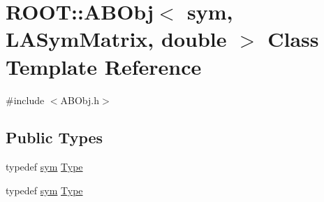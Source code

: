 \hypertarget{classROOT_1_1Minuit2_1_1ABObj_3_01sym_00_01LASymMatrix_00_01double_01_4}{}\section{R\+O\+OT\+:\+:A\+B\+Obj$<$ sym, L\+A\+Sym\+Matrix, double $>$ Class Template Reference}
\label{classROOT_1_1Minuit2_1_1ABObj_3_01sym_00_01LASymMatrix_00_01double_01_4}


{\ttfamily \#include $<$A\+B\+Obj.\+h$>$}

\subsection*{Public Types}
\begin{DoxyCompactItemize}
\item 
typedef \mbox{\hyperlink{classROOT_1_1Minuit2_1_1sym}{sym}} \mbox{\hyperlink{classROOT_1_1Minuit2_1_1ABObj_3_01sym_00_01LASymMatrix_00_01double_01_4_ac7186d69c32b1e8a607ae45125e869c0}{Type}}
\item 
typedef \mbox{\hyperlink{classROOT_1_1Minuit2_1_1sym}{sym}} \mbox{\hyperlink{classROOT_1_1Minuit2_1_1ABObj_3_01sym_00_01LASymMatrix_00_01double_01_4_ac7186d69c32b1e8a607ae45125e869c0}{Type}}
\end{DoxyCompactItemize}
